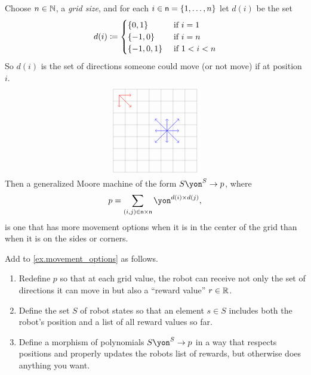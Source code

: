 \documentclass[DynamicalBook]{subfiles}
\begin{document}
\begin{example}\label{ex.movement_options}
Choose $n\in\mathbb{N}$, a \emph{grid size}, and for each $i\in\mathsf{n}=\{1,\ldots,n\}$ let $d(i)$ be the set
\[
	d(i)\coloneqq
	\begin{cases}
		\{0,1\}&\textnormal{ if }i=1\\
		\{-1,0\}&\textnormal{ if }i=n\\
		\{-1,0,1\}&\textnormal{ if } 1<i<n
	\end{cases}
\]
So $d(i)$ is the set of directions someone could move (or not move) if at position $i$.
\[
\begin{tikzpicture}[scale=.5]
  \draw[step=1cm,gray,very thin] (-3,-3) grid (4,4);
	\draw[->, red ] (-2.5,3.5) -- (-1.5, 3.5);
	\draw[->, red ] (-2.5,3.5) -- (-1.5, 2.5);
	\draw[->, red ] (-2.5,3.5) -- (-2.5, 2.5);
	\draw[->, blue] (1.5, 0.5) -- (0.5, 0.5);
	\draw[->, blue] (1.5, 0.5) -- (2.5, 0.5);
	\draw[->, blue] (1.5, 0.5) -- (1.5, 1.5);
	\draw[->, blue] (1.5, 0.5) -- (1.5,-0.5);
	\draw[->, blue] (1.5, 0.5) -- (0.5, 1.5);
	\draw[->, blue] (1.5, 0.5) -- (0.5,-0.5);
	\draw[->, blue] (1.5, 0.5) -- (2.5, 1.5);
	\draw[->, blue] (1.5, 0.5) -- (2.5,-0.5);
\end{tikzpicture}
\]
Then a generalized Moore machine of the form $S\yon^S\to p$, where
\[
p= \sum_{(i,j)\in\ord{n}\times\ord{n}}\yon^{d(i)\times d(j)},
\]
is one that has more movement options when it is in the center of the grid than when it is on the sides or corners.
\end{example}

\begin{exercise}
Add to \cref{ex.movement_options} as follows.
\begin{enumerate}
	\item Redefine $p$ so that at each grid value, the robot can receive not only the set of directions it can move in but also a ``reward value'' $r\in\mathbb{R}$. 
	\item Define the set $S$ of robot states so that an element $s\in S$ includes both the robot's position and a list of all reward values so far.
	\item Define a morphism of polynomials $S\yon^S\to p$ in a way that respects positions and properly updates the robots list of rewards, but otherwise does anything you want.
\qedhere
\end{enumerate}
\end{exercise}
\end{document}
